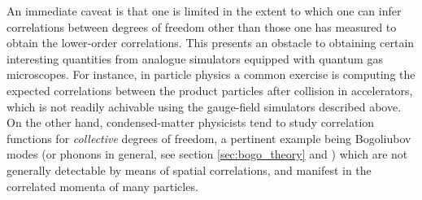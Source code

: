 	An immediate caveat is that one is limited in the extent to which one can infer correlations between degrees of freedom other than those one has measured to obtain the lower-order correlations. 
	This presents an obstacle to obtaining certain interesting quantities from analogue simulators equipped with quantum gas microscopes.
	For instance, in particle physics a common exercise is computing the expected correlations between the product particles after collision in accelerators, which is not readily achivable using the gauge-field simulators described above.
	On the other hand, condensed-matter physicists tend to study correlation functions for \emph{collective} degrees of freedom, a pertinent example being Bogoliubov modes (or phonons in general, see section \ref{sec:bogo_theory} and \cite{Bogoliubov47}) which are not generally detectable by means of spatial correlations, and manifest in the correlated momenta of many particles.


